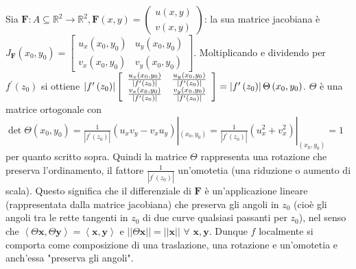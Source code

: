 \documentclass{article}
\begin{document}
Sia $\mathbf{F}:A\subseteq 
\mathbb{R}
^{2}\rightarrow 
\mathbb{R}
^{2},\mathbf{F}\left( x,y\right) =\left( 
\begin{array}{c}
u\left( x,y\right) \\ 
v\left( x,y\right)%
\end{array}%
\right) $: la sua matrice jacobiana \`{e} $J_{\mathbf{F}}\left(
x_{0},y_{0}\right) =\left[ 
\begin{array}{cc}
u_{x}\left( x_{0},y_{0}\right) & u_{y}\left( x_{0},y_{0}\right) \\ 
v_{x}\left( x_{0},y_{0}\right) & v_{y}\left( x_{0},y_{0}\right)%
\end{array}%
\right] $. Moltiplicando e dividendo per $f^{\prime }\left( z_{0}\right) $
si ottiene $\left\vert f^{\prime }\left( z_{0}\right) \right\vert \left[ 
\begin{array}{cc}
\frac{u_{x}\left( x_{0},y_{0}\right) }{\left\vert f^{\prime }\left(
z_{0}\right) \right\vert } & \frac{u_{y}\left( x_{0},y_{0}\right) }{%
\left\vert f^{\prime }\left( z_{0}\right) \right\vert } \\ 
\frac{v_{x}\left( x_{0},y_{0}\right) }{\left\vert f^{\prime }\left(
z_{0}\right) \right\vert } & \frac{v_{y}\left( x_{0},y_{0}\right) }{%
\left\vert f^{\prime }\left( z_{0}\right) \right\vert }%
\end{array}%
\right] =\left\vert f^{\prime }\left( z_{0}\right) \right\vert \Theta \left(
x_{0},y_{0}\right) $. $\Theta $ \`{e} una matrice ortogonale con $\det
\Theta \left( x_{0},y_{0}\right) =\frac{1}{\left\vert f^{\prime }\left(
z_{0}\right) \right\vert }\left( u_{x}v_{y}-v_{x}u_{y}\right) |_{\left(
x_{0},y_{0}\right) }=\frac{1}{\left\vert f^{\prime }\left( z_{0}\right)
\right\vert }\left( u_{x}^{2}+v_{x}^{2}\right) |_{\left( x_{0},y_{0}\right)
}=1$ per quanto scritto sopra. Quindi la matrice $\Theta $ rappresenta una
rotazione che preserva l'ordinamento, il fattore $\frac{1}{\left\vert
f^{\prime }\left( z_{0}\right) \right\vert }$ un'omotetia (una riduzione o
aumento di scala). Questo significa che il differenziale di $\mathbf{F}$ 
\`{e} un'applicazione lineare (rappresentata dalla matrice jacobiana) che
preserva gli angoli in $z_{0}$ (cio\`{e} gli angoli tra le rette tangenti in 
$z_{0}$ di due curve qualsiasi passanti per $z_{0}$), nel senso che $%
\left\langle \Theta \mathbf{x},\Theta \mathbf{y}\right\rangle =\left\langle 
\mathbf{x,y}\right\rangle $ e $\left\vert \left\vert \Theta \mathbf{x}%
\right\vert \right\vert =\left\vert \left\vert \mathbf{x}\right\vert
\right\vert $ $\forall $ $\mathbf{x,y}$. Dunque $f$ localmente si comporta
come composizione di una traslazione, una rotazione e un'omotetia e
anch'essa "preserva gli angoli".
\end{document}

